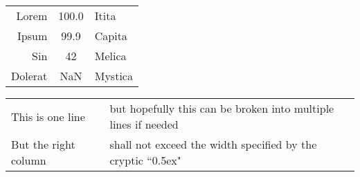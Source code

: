 \documentclass{article}
\begin{document}
\begin{tabular}{rcl}
  Lorem   & 100.0 & Itita \\
  Ipsum   & 99.9  & Capita \\
  Sin     & 42    & Melica \\
  Dolerat & NaN   & Mystica \\
\end{tabular}

\begin{table}[h] %
\begin{tabular}{l|p{36.5ex}} %
  This is one line & but hopefully this can be broken into multiple lines if needed \\
  But the right column & shall not exceed the width specified by the cryptic ``0.5ex" \\
\end{tabular}
\end{table}
\end{document}

